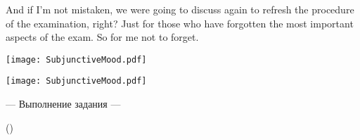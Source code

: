 \documentclass[main.tex]{subfiles}
\begin{document}
And if I'm not mistaken, we were going to discuss again to refresh the procedure of the examination, right?
Just for those who have forgotten the most important aspects of the exam.
So for me not to forget.

\newpage
{}
\label{subsec:subjunctive-mood-lk}
{\parindent-10pt\texttt{[image: SubjunctiveMood.pdf]}}

\vspace{-5.7pt}
{\parindent-10pt\texttt{[image: SubjunctiveMood.pdf]}}\newpage

\newpage
{}

\hypertarget{ltask:2024-03-20}{--- Выполнение задания ---} (\hyperref[task:2024-03-20]{\color{blue}{перейти к тексту задания}})
\\

\end{document}
